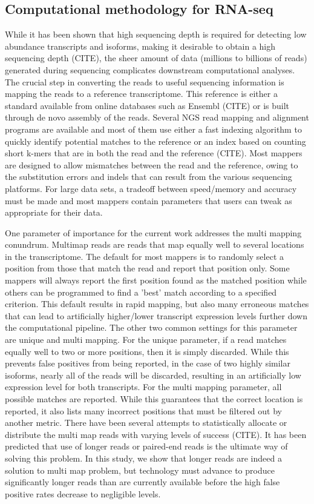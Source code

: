 \documentclass[10pt]{article}
\begin{document}
\subsection*{Computational methodology for RNA-seq}

While it has been shown that high sequencing depth is required for detecting low abundance transcripts and isoforms, making it desirable to obtain a high sequencing depth (CITE), the sheer amount of data (millions to billions of reads) generated during sequencing complicates downstream computational analyses.  The crucial step in converting the reads to useful sequencing information is mapping the reads to a reference transcriptome. This reference is either a standard available from online databases such as Ensembl (CITE) or is built through de novo assembly of the reads.  Several NGS read mapping and alignment programs are available and most of them use either a fast indexing algorithm to quickly identify potential matches to the reference or an index based on counting short k-mers that are in both the read and the reference (CITE).  Most mappers are designed to allow mismatches between the read and the reference, owing to the substitution errors and indels that can result from the various sequencing platforms.  For large data sets, a tradeoff between speed/memory and accuracy must be made and most mappers contain parameters that users can tweak as appropriate for their data.  

One parameter of importance for the current work addresses the multi mapping conundrum.  Multimap reads are reads that map equally well to several locations in the transcriptome.  The default for most mappers is to randomly select a position from those that match the read and report that position only.  Some mappers will always report the first position found as the matched position while others can be programmed to find a 'best' match according to a specified criterion.  This default results in rapid mapping, but also many erroneous matches that can lead to artificially higher/lower transcript expression levels further down the computational pipeline.  The other two common settings for this parameter are unique and multi mapping.  For the unique parameter, if a read matches equally well to two or more positions, then it is simply discarded.  While this prevents false positives from being reported, in the case of two highly similar isoforms, nearly all of the reads will be discarded, resulting in an artificially low expression level for both transcripts.  For the multi mapping parameter, all possible matches are reported.  While this guarantees that the correct location is reported, it also lists many incorrect positions that must be filtered out by another metric.  There have been several attempts to statistically allocate or distribute the multi map reads with varying levels of success (CITE).  It has been predicted that use of longer reads or paired-end reads is the ultimate way of solving this problem.  In this study, we show that longer reads are indeed a solution to multi map problem, but technology must advance to produce significantly longer reads than are currently available before the high false positive rates decrease to negligible levels.  
\end{document}
